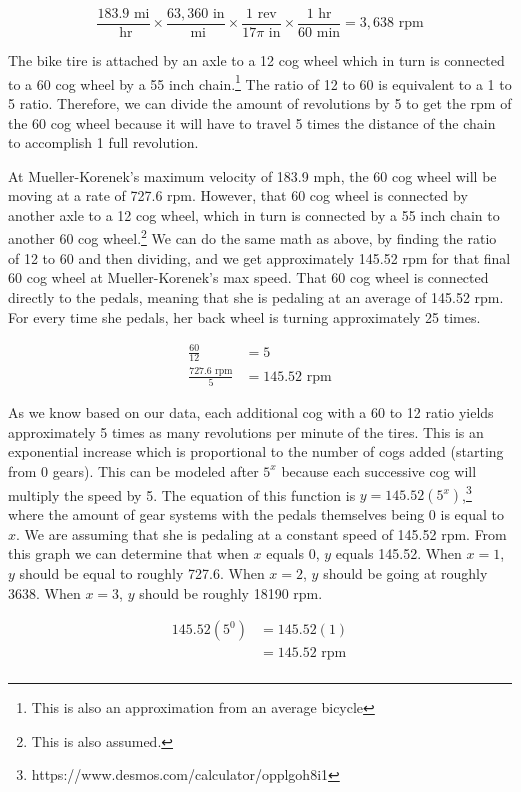 $$
\frac{183.9 \text{ mi}}{\text{ hr}} \times \frac{63,360 \text{ in}}{\text{ mi}} \times \frac{1 \text{ rev}}{17\pi \text{ in}} \times \frac{1 \text{ hr}}{60 \text{ min}} = 3,638 \text{ rpm}
$$

The bike tire is attached by an axle to a 12 cog wheel which in turn is connected to a 60 cog wheel by a 55 inch chain.\footnote{This is also an approximation from an average bicycle}
The ratio of 12 to 60 is equivalent to a 1 to 5 ratio. Therefore, we can divide the amount of revolutions by 5 to get the rpm of the 60 cog wheel because it will have to travel 5 times the distance of the chain to accomplish 1 full revolution. 

At Mueller-Korenek’s maximum velocity of 183.9 mph, the 60 cog wheel will be moving at a rate of 727.6 rpm. However, that 60 cog wheel is connected by another axle to a 12 cog wheel, which in turn is connected by a 55 inch chain to another 60 cog wheel.\footnote{This is also assumed.} 
We can do the same math as above, by finding the ratio of 12 to 60 and then dividing, and we get approximately 145.52 rpm for that final 60 cog wheel at Mueller-Korenek’s max speed. That 60 cog wheel is connected directly to the pedals, meaning that she is pedaling at an average of 145.52 rpm. For every time she pedals, her back wheel is turning approximately 25 times.

\begin{align*}
\frac{60}{12} &= 5 \\
\frac{727.6 \text{ rpm}}{5} &= 145.52 \text{ rpm} 
\end{align*}

As we know based on our data, each additional cog with a 60 to 12 ratio yields approximately 5 times as many revolutions per minute of the tires. This is an exponential increase which is proportional to the number of cogs added (starting from 0 gears). This can be modeled after $5^{x}$ because each successive cog will multiply the speed by 5. The equation of this function is $y=145.52(5^{x})$,\footnote{https://www.desmos.com/calculator/opplgoh8i1} where the amount of gear systems with the pedals themselves being 0 is equal to $x$. We are assuming that she is pedaling at a constant speed of 145.52 rpm. From this graph we can determine that when $x$ equals 0, $y$ equals 145.52. When $x = 1$, $y$ should be equal to roughly 727.6. When $x = 2$, $y$ should be going at roughly 3638. When $x = 3$, $y$ should  be roughly 18190 rpm. 

\begin{align*}
145.52(5^{0}) &= 145.52(1) \\
&= 145.52 \text{ rpm} \\
\end{align*}


